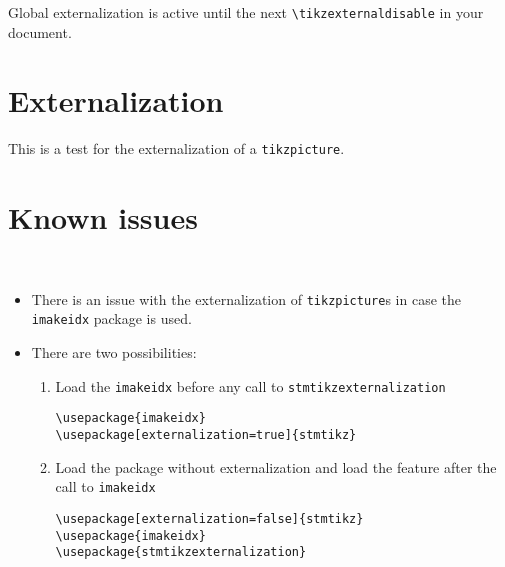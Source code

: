 \documentclass{scrartcl}
\begin{document}
Global externalization is active until the next \texttt{\textbackslash tikzexternaldisable} in your document.

\section{Externalization}

This is a test for the externalization of a \texttt{tikzpicture}.

\begin{figure}[htbp]
\centering
\tikzexternalenable
{}
\tikzexternaldisable
\end{figure}

\section{Known issues}

\begin{description}[leftmargin=\parindent,labelindent=\parindent,style=nextline]
% 
\item[\texttt{misplaced \textbackslash printindex} error.]\mbox{}\\[-2.0\baselineskip]%
  \begin{itemize}[noitemsep]
    \item There is an issue with the externalization of \texttt{tikzpicture}s in case the \texttt{imakeidx} package is used.
    \item There are two possibilities:
    \begin{enumerate}
      \item Load the \texttt{imakeidx} before any call to \texttt{stmtikzexternalization}
\begin{verbatim}
\usepackage{imakeidx}
\usepackage[externalization=true]{stmtikz}
\end{verbatim}
      \item Load the package without externalization and load the feature after the call to  \texttt{imakeidx}
\begin{verbatim}
\usepackage[externalization=false]{stmtikz}
\usepackage{imakeidx}
\usepackage{stmtikzexternalization}
\end{verbatim}
    \end{enumerate}

  \end{itemize}
%
\end{description}
\end{document}
